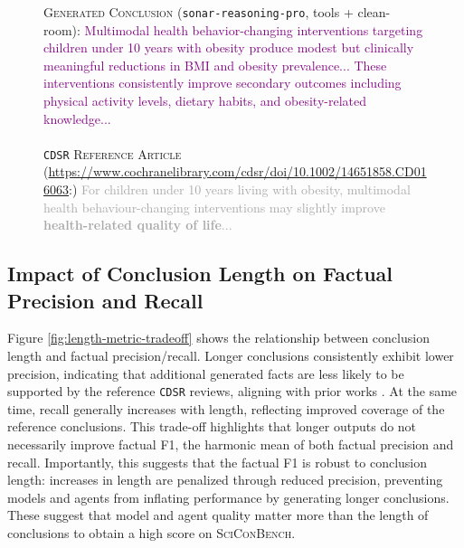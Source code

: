 \documentclass{article}
\begin{document}
\begin{figure}[h!]
\centering
\begin{small}
\begin{tcolorbox}[colback=gray!5, colframe=red, width=\textwidth]
\textsc{Generated Conclusion} (\texttt{sonar-reasoning-pro}, tools + clean-room): \textcolor{purple}{Multimodal health behavior-changing interventions targeting children under 10 years with obesity produce modest but clinically meaningful reductions in BMI and obesity prevalence... These interventions consistently improve secondary outcomes including physical activity levels, dietary habits, and obesity-related knowledge...}\\\\
\texttt{CDSR} \textsc{Reference Article} (\url{https://www.cochranelibrary.com/cdsr/doi/10.1002/14651858.CD016063}:) \textcolor{darkgray}{For children under 10 years living with obesity, multimodal health behaviour-changing interventions may slightly improve \textbf{health-related quality of life}...}

\end{tcolorbox}
\end{small}
\end{figure}







\subsection{Impact of Conclusion Length on Factual Precision and Recall}\label{appendix:length-metric-tradeoff}

Figure \ref{fig:length-metric-tradeoff} shows the relationship between conclusion length and factual precision/recall. Longer conclusions consistently exhibit lower precision, indicating that additional generated facts are less likely to be supported by the reference \texttt{CDSR} reviews, aligning with prior works \cite{asai2023self, liu-etal-2023-evaluating}. At the same time, recall generally increases with length, reflecting improved coverage of the reference conclusions. This trade-off highlights that longer outputs do not necessarily improve factual F1, the harmonic mean of both factual precision and recall. Importantly, this suggests that the factual F1 is robust to conclusion length: increases in length are penalized through reduced precision, preventing models and agents from inflating performance by generating longer conclusions. These suggest that model and agent quality matter more than the length of conclusions to obtain a high score on \textsc{SciConBench}.
\end{document}
